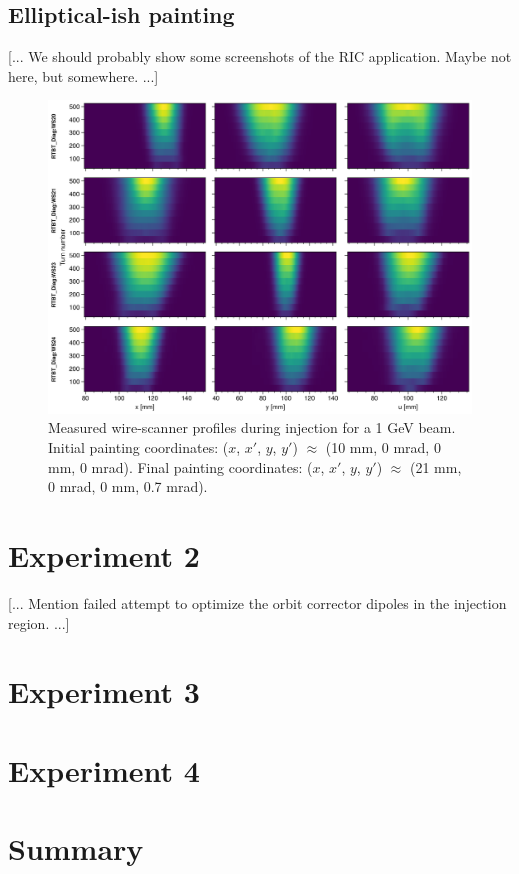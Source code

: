 \subsection{Elliptical-ish painting}

[... We should probably show some screenshots of the RIC application. Maybe not here, but somewhere. ...]

%
\begin{figure}[!p]
    \centering
    \includegraphics[width=\textwidth]{Images/chapter5/exp1_waterfall_ellipticalish.png}
    \caption{Measured wire-scanner profiles during injection for a 1 GeV beam. Initial painting coordinates: ($x$, $x'$, $y$, $y'$) $\approx$ (10 mm, 0 mrad, 0 mm, 0 mrad). Final painting coordinates: ($x$, $x'$, $y$, $y'$) $\approx$ (21 mm, 0 mrad, 0 mm, 0.7 mrad).}
    \label{fig:exp1_waterfall_ellipticalish}
\end{figure}
%



\section{Experiment 2}

[... Mention failed attempt to optimize the orbit corrector dipoles in the injection region. ...]


\section{Experiment 3}



\section{Experiment 4}



\section{Summary}